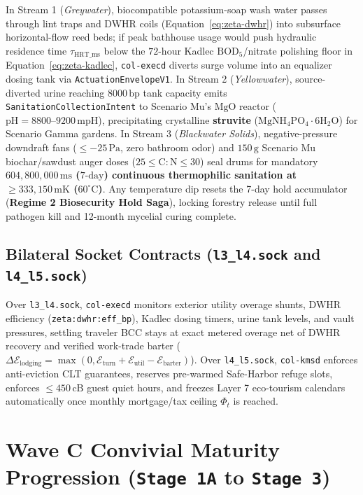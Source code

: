 In Stream 1 (\textit{Greywater}), biocompatible potassium-soap wash water passes through lint
traps and DWHR coils (Equation~\eqref{eq:zeta-dwhr}) into subsurface horizontal-flow reed
beds; if peak bathhouse usage would push hydraulic residence time $\tau_{\mathrm{HRT\_ms}}$
below the $72\text{-hour}$ Kadlec $\mathrm{BOD}_5$/nitrate polishing floor in
Equation~\eqref{eq:zeta-kadlec}, \texttt{col-execd} diverts surge volume into an equalizer
dosing tank via \texttt{ActuationEnvelopeV1}. In Stream 2 (\textit{Yellowwater}), source-diverted
urine reaching $8000\,\mathrm{bp}$ tank capacity emits \texttt{SanitationCollectionIntent} to
Scenario Mu's $\mathrm{MgO}$ reactor ($\mathrm{pH} = 8800\text{--}9200\,\mathrm{mpH}$),
precipitating crystalline \textbf{struvite} ($\mathrm{MgNH_4PO_4 \cdot 6H_2O}$) for Scenario Gamma
gardens. In Stream 3 (\textit{Blackwater Solids}), negative-pressure downdraft fans
($\le -25\,\mathrm{Pa}$, zero bathroom odor) and $150\,\mathrm{g}$ Scenario Mu biochar/sawdust
auger doses ($25 \le \mathrm{C:N} \le 30$) seal drums for mandatory \textbf{$604{,}800{,}000\,\mathrm{ms}$
($7\text{-day}$) continuous thermophilic sanitation at $\ge 333{,}150\,\mathrm{mK}$
($60^\circ\mathrm{C}$)}. Any temperature dip resets the 7-day hold accumulator (\textbf{Regime 2
Biosecurity Hold Saga}), locking forestry release until full pathogen kill and 12-month
mycelial curing complete.

\subsection{Bilateral Socket Contracts (\texttt{l3\_l4.sock} and \texttt{l4\_l5.sock})}

Over \texttt{l3\_l4.sock}, \texttt{col-execd} monitors exterior utility overage shunts,
DWHR efficiency (\texttt{zeta:dwhr:eff\_bp}), Kadlec dosing timers, urine tank levels, and
vault pressures, settling traveler BCC stays at exact metered overage net of DWHR recovery
and verified work-trade barter ($\Delta \mathcal{E}_{\mathrm{lodging}} = \max(0, \mathcal{E}_{\mathrm{turn}} + \mathcal{E}_{\mathrm{util}} - \mathcal{E}_{\mathrm{barter}})$).
Over \texttt{l4\_l5.sock}, \texttt{col-kmsd} enforces anti-eviction CLT guarantees, reserves
pre-warmed Safe-Harbor refuge slots, enforces $\le 450\,\mathrm{cB}$ guest quiet hours, and
freezes Layer 7 eco-tourism calendars automatically once monthly mortgage/tax ceiling
$\Phi_t$ is reached.

\section{Wave C Convivial Maturity Progression (\texttt{Stage 1A} to \texttt{Stage 3})}
\label{sec:wave-c-maturity}

